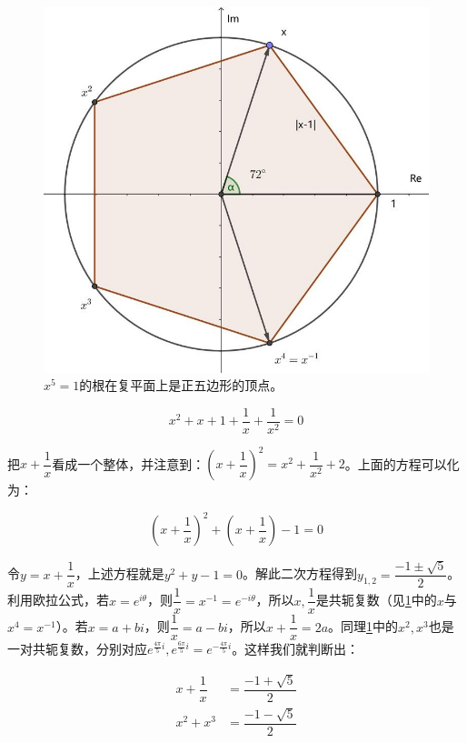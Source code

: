 \documentclass[b5paper]{ctexart}
\begin{document}
\begin{figure}[htbp]
  \centering
  \includegraphics[scale=0.3]{img/pentagon-z}
  \caption{$x^5 = 1$的根在复平面上是正五边形的顶点。}
 \label{fig:pentagon-z}
\end{figure}

\[
x^2 + x + 1 + \frac{1}{x} + \frac{1}{x^2} = 0
\]

把$x + \dfrac{1}{x}$看成一个整体，并注意到：$(x + \dfrac{1}{x})^2 = x^2 + \dfrac{1}{x^2} + 2$。上面的方程可以化为：

\[
(x + \frac{1}{x})^2 + (x + \frac{1}{x}) - 1 = 0
\]

令$y = x + \dfrac{1}{x}$，上述方程就是$y^2 + y - 1 = 0$。解此二次方程得到$y_{1,2} = \dfrac{-1 \pm \sqrt{5}}{2}$。利用欧拉公式，若$x = e^{i\theta}$，则$\dfrac{1}{x} = x^{-1} = e^{-i\theta}$，所以$x, \dfrac{1}{x}$是共轭复数（见\cref{fig:pentagon-z}中的$x$与$x^4 = x^{-1}$）。若$x = a + bi$，则$\dfrac{1}{x} = a - bi$，所以$x + \dfrac{1}{x} = 2a$。同理\cref{fig:pentagon-z}中的$x^2, x^3$也是一对共轭复数，分别对应$e^{\frac{4\pi}{5}i}, e^{\frac{6\pi}{5}i} = e^{-\frac{4\pi}{5}i}$。这样我们就判断出：

\begin{align*}
x + \dfrac{1}{x} &= \dfrac{-1 + \sqrt{5}}{2} \\
x^2 + x^3 &= \dfrac{-1 - \sqrt{5}}{2}
\end{align*}
\end{document}
